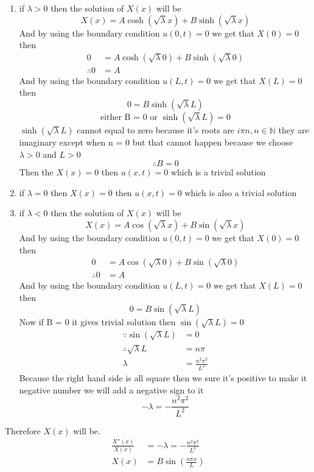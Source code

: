 \documentclass[]{article}
\begin{document}
\begin{enumerate}
\item if $\lambda > 0$ then the solution of $X(x)$ will be 
\[
X(x) = A \cosh(\sqrt{\lambda} x) + B \sinh(\sqrt{\lambda}x)
\]
And by using the boundary condition $u(0,t) = 0$ we get that $X(0) = 0$ then
\begin{align*}
    0 &= A \cosh(\sqrt{\lambda} 0) + B \sinh(\sqrt{\lambda}0)\\
    \therefore 0 &= A
\end{align*}
And by using the boundary condition $u(L,t) = 0$ we get that $X(L) = 0$ then
\[
    0 = B \sinh(\sqrt{\lambda}L)    
\]
\[
    \text{either B = 0 or } \sinh(\sqrt{\lambda}L) = 0    
\]    
$\sinh(\sqrt{\lambda}L)$ cannot equal to zero because it's roots are $i \pi n , n \in \mathbb{N}$ 
they are imaginary except when n = 0 but that cannot happen because we choose $\lambda > 0$ and $L > 0$
\[
    \therefore B = 0
\]
Then the $X(x) = 0$ then $u(x,t) = 0 $ which is a trivial solution
\item if $\lambda = 0$ then $X(x) = 0 $ then $u(x,t) = 0 $ which is also a trivial solution
\item if $\lambda < 0$ then the solution of $X(x)$ will be 
\[
X(x) = A \cos(\sqrt{\lambda} x) + B \sin(\sqrt{\lambda}x)
\]
And by using the boundary condition $u(0,t) = 0$ we get that $X(0) = 0$ then
\begin{align*}
    0 &= A \cos(\sqrt{\lambda} 0) + B \sin(\sqrt{\lambda}0)\\
    \therefore 0 &= A
\end{align*} 
And by using the boundary condition $u(L,t) = 0$ we get that $X(L) = 0$ then
\[
    0 = B \sin  (\sqrt{\lambda}L)    
\]
Now if B = 0 it gives trivial solution then $\sin(\sqrt{\lambda}L) = 0$ 
\begin{align*}
    \because \sin(\sqrt{\lambda}L) &= 0 \\
    \therefore \sqrt{\lambda} L &= n \pi \\
    \lambda &= \frac{n^2 \pi^2}{L^2}
\end{align*}
Because the right hand side is all square then we sure it's positive to make it negative number we will add a negative sign to it
\[
    -\lambda = -\frac{n^2 \pi^2}{L^2}
\]
\end{enumerate}
Therefore $X(x)$ will be.
\begin{align*}
\frac{X''(x)}{X(x)} &= -\lambda = -\frac{n^2 \pi^2}{L^2}
\\
X(x) &= B \sin\left(\frac{n\pi x}{L}\right)
\end{align*}
\end{document}
